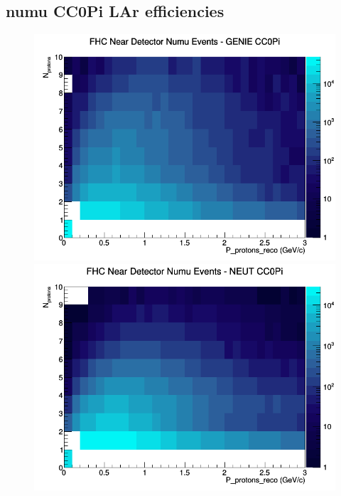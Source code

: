 \subsection{numu CC0Pi LAr efficiencies}
\begin{figure}[h]
\includegraphics[width=\linewidth]{eff_N_P/LAr/protons/CC0Pi_FHC_ND_numu_N_P_GENIE.png}
\endminipage
{}
\includegraphics[width=\linewidth]{eff_N_P/LAr/protons/CC0Pi_FHC_ND_numu_N_P_NEUT.png}
\endminipage
{}

\end{figure}
